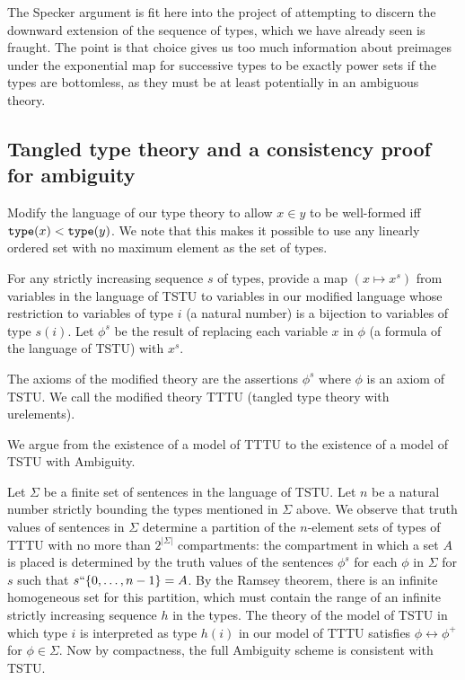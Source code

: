 \documentclass[12pt]{article}
\begin{document}
The Specker argument is fit here into the project of attempting to discern the downward extension of the sequence of types, which we have already seen is fraught.  The point is that choice gives us too much information
about preimages under the exponential map for successive types to be exactly power sets if the types are bottomless, as they must be at least potentially in an ambiguous theory.

\subsection{Tangled type theory and a consistency proof for ambiguity}

Modify the language of our type theory to allow $x \in y$ to be well-formed iff ${\tt type}(x) < {\tt type}(y)$.  We note that this makes it possible to use any linearly ordered set with no maximum element
as the set of types.

For any strictly increasing sequence $s$ of types, provide a map $(x\mapsto x^s)$ from variables in the language of TSTU to variables in our modified language  whose restriction to variables of type $i$ (a natural number) is a bijection to variables of type $s(i)$.  Let $\phi^s$ be
the result of replacing each variable $x$ in $\phi$ (a formula of the language of TSTU) with $x^s$.

The axioms of the modified theory are the assertions $\phi^s$ where $\phi$ is an axiom of TSTU.  We call the modified theory TTTU (tangled type theory with urelements).

We argue from the existence of a model of TTTU to the existence of a model of TSTU with Ambiguity.

Let $\Sigma$ be a finite set of sentences in the language of TSTU.  Let $n$ be a natural number strictly bounding the types mentioned in $\Sigma$ above.  We observe that truth values of sentences in $\Sigma$ determine a partition of the $n$-element sets of types of TTTU with no more than $2^{|\Sigma|}$ compartments:  the compartment in which a set $A$ is placed is determined by the truth values of the sentences $\phi^s$ for each $\phi$ in $\Sigma$  for $s$ such that $s``\{0,\ldots,n-1\}=A$.  By the Ramsey theorem, there is an infinite homogeneous set for this partition, which must contain the range of an infinite strictly increasing sequence $h$ in the types.  The theory of the model
of TSTU in which type $i$ is interpreted as type $h(i)$ in our model of TTTU satisfies $\phi \leftrightarrow \phi^+$ for $\phi \in \Sigma$.  Now by compactness, the full Ambiguity scheme is consistent with TSTU.
\end{document}
